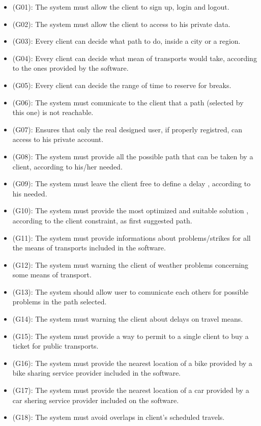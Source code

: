 \documentclass[a4paper]{book}
\begin{document}
\begin{itemize}

\item (G01): The system must allow the client to sign up, login and logout.
\item (G02): The system must allow the client to access to his private data.
\item (G03): Every client can decide what path to do, inside a city or a region.
\item (G04): Every client can decide what mean of transports would take, according to the ones provided by the software.
\item (G05): Every client can decide the range of time to reserve for breaks. 
\item (G06): The system must comunicate to the client that a path (selected by this one) is not reachable.
\item (G07): Ensures that only the real designed user, if properly registred, can access to his private account.
\item (G08): The system must provide all the possible path that can be taken by a client, according to his/her needed.
\item (G09): The system must leave the client free to define a delay , according to his needed.
\item (G10): The system must provide the most optimized and suitable solution , according to the client constraint, as first suggested path.
\item (G11): The system must provide informations about problems/strikes for all the means of transports included in the software.
\item (G12): The system must warning the client of weather problems concerning some means of transport.
\item (G13): The system should allow user to comunicate each others for possible problems in the path selected.
\item (G14): The system must warning the client about delays on travel means.
\item (G15): The system must provide a way to permit to a single client to buy a ticket for public transports.
\item (G16): The system must provide the nearest location of a bike provided by a bike sharing service provider included in the software.
\item (G17): The system must provide the nearest location of a car provided by a car shering service provider included on the software.
\item (G18): The system must avoid overlaps in client's scheduled travels.

\end{itemize}
\end{document}
